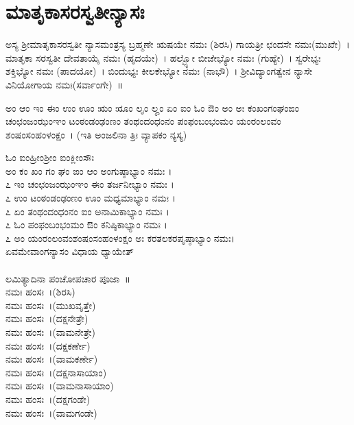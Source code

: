 \section{ಮಾತೃಕಾಸರಸ್ವತೀನ್ಯಾಸಃ}
ಅಸ್ಯ ಶ್ರೀಮಾತೃಕಾಸರಸ್ವತೀ ನ್ಯಾಸಮಂತ್ರಸ್ಯ ಬ್ರಹ್ಮಣೇ ಋಷಯೇ ನಮಃ (ಶಿರಸಿ) ಗಾಯತ್ರೀ ಛಂದಸೇ ನಮಃ(ಮುಖೇ)~। ಮಾತೃಕಾ ಸರಸ್ವತೀ ದೇವತಾಯೈ ನಮಃ (ಹೃದಯೇ)~। ಹಲ್ಭ್ಯೋ ಬೀಜೇಭ್ಯೋ ನಮಃ (ಗುಹ್ಯೇ)~। ಸ್ವರೇಭ್ಯಃ ಶಕ್ತಿಭ್ಯೋ ನಮಃ (ಪಾದಯೋ)~। ಬಿಂದುಭ್ಯಃ ಕೀಲಕೇಭ್ಯೋ ನಮಃ (ನಾಭೌ)~। ಶ್ರೀವಿದ್ಯಾಂಗತ್ವೇನ ನ್ಯಾಸೇ ವಿನಿಯೋಗಾಯ ನಮಃ(ಸರ್ವಾಂಗೇ)~॥

ಅಂ ಆಂ ಇಂ ಈಂ ಉಂ ಊಂ ಋಂ ೠಂ ಲೃಂ ಲೄಂ ಏಂ ಐಂ ಓಂ ಔಂ ಅಂ ಅಃ ಕಂಖಂಗಂಘಂಙಂ ಚಂಛಂಜಂಝಂಞಂ ಟಂಠಂಡಂಢಂಣಂ ತಂಥಂದಂಧಂನಂ ಪಂಫಂಬಂಭಂಮಂ ಯಂರಂಲಂವಂ ಶಂಷಂಸಂಹಂಳಂಕ್ಷಂ~। (ಇತಿ ಅಂಜಲಿನಾ ತ್ರಿಃ ವ್ಯಾಪಕಂ ನ್ಯಸ್ಯ)

ಓಂ ಐಂಹ್ರೀಂಶ್ರೀಂ ಐಂಕ್ಲೀಂಸೌಃ\\ಅಂ ಕಂ ಖಂ ಗಂ ಘಂ ಙಂ ಆಂ ಅಂಗುಷ್ಠಾಭ್ಯಾಂ ನಮಃ ।\\
೭ ಇಂ ಚಂಛಂಜಂಝಂಞಂ ಈಂ ತರ್ಜನೀಭ್ಯಾಂ ನಮಃ ।\\
೭ ಉಂ ಟಂಠಂಡಂಢಂಣಂ ಊಂ ಮಧ್ಯಮಾಭ್ಯಾಂ ನಮಃ ।\\
೭ ಏಂ ತಂಥಂದಂಧಂನಂ ಐಂ ಅನಾಮಿಕಾಭ್ಯಾಂ ನಮಃ ।\\
೭ ಓಂ ಪಂಫಂಬಂಭಂಮಂ ಔಂ ಕನಿಷ್ಠಿಕಾಭ್ಯಾಂ ನಮಃ ।\\
೭ ಅಂ ಯಂರಂಲಂವಂಶಂಷಂಸಂಹಂಳಂಕ್ಷಂ ಅಃ ಕರತಲಕರಪೃಷ್ಠಾಭ್ಯಾಂ ನಮಃ।\\
ಏವಮೇವಾಂಗನ್ಯಾಸಂ ವಿಧಾಯ ಧ್ಯಾಯೇತ್ \\
\\
ಲಮಿತ್ಯಾದಿನಾ ಪಂಚೋಪಚಾರ ಪೂಜಾ~॥\\
 ನಮಃ ಹಂಸಃ~।(ಶಿರಸಿ)\\
 ನಮಃ ಹಂಸಃ~।(ಮುಖವೃತ್ತೇ)\\
 ನಮಃ ಹಂಸಃ~।(ದಕ್ಷನೇತ್ರೇ)\\
 ನಮಃ ಹಂಸಃ~।(ವಾಮನೇತ್ರೇ)\\
 ನಮಃ ಹಂಸಃ~।(ದಕ್ಷಕರ್ಣೇ)\\
 ನಮಃ ಹಂಸಃ~।(ವಾಮಕರ್ಣೇ)\\
 ನಮಃ ಹಂಸಃ~।(ದಕ್ಷನಾಸಾಯಾಂ)\\
 ನಮಃ ಹಂಸಃ~।(ವಾಮನಾಸಾಯಾಂ)\\
 ನಮಃ ಹಂಸಃ~।(ದಕ್ಷಗಂಡೇ)\\
 ನಮಃ ಹಂಸಃ~।(ವಾಮಗಂಡೇ)\\
